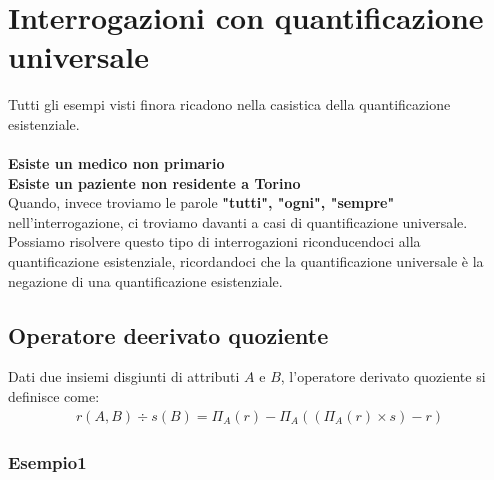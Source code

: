 \section{Interrogazioni con quantificazione universale}
Tutti gli esempi visti finora ricadono nella casistica della quantificazione esistenziale.\\\\
\textbf{Esiste un medico non primario}\\
\textbf{Esiste un paziente non residente a Torino}\\
Quando, invece troviamo le parole \textbf{"tutti", "ogni", "sempre"} nell'interrogazione, ci troviamo davanti a casi di quantificazione universale.\\
Possiamo risolvere questo tipo di interrogazioni riconducendoci alla quantificazione esistenziale, ricordandoci che la quantificazione universale è la negazione di una quantificazione esistenziale.

\subsection{Operatore deerivato quoziente}
Dati due insiemi disgiunti di attributi $A$ e $B$, l'operatore derivato quoziente si definisce come:
    \begin{equation}\begin{aligned}
        r(A, B) \div s(B) = \Pi_A (r) - \Pi_A ((\Pi_A(r) \times s) - r)
    \end{aligned}\end{equation}
\subsubsection{Esempio1}

